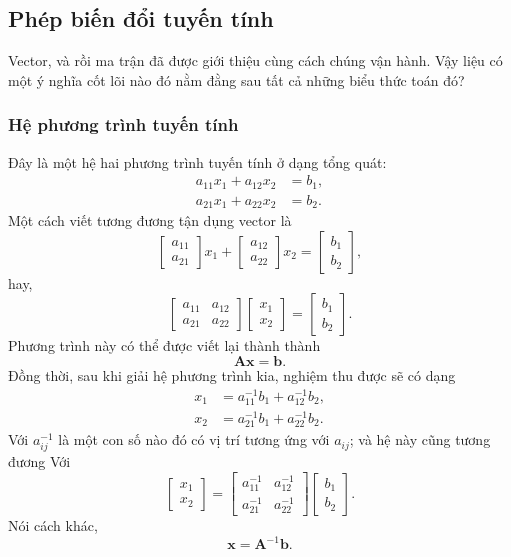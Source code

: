 \subsection{Phép biến đổi tuyến tính}
Vector, và rồi ma trận đã được giới thiệu cùng cách chúng vận hành. Vậy liệu có một ý nghĩa cốt lõi nào đó nằm đằng sau tất cả những biểu thức toán đó?  
\subsubsection*{Hệ phương trình tuyến tính}
Đây là một hệ hai phương trình tuyến tính ở dạng tổng quát:
\begin{align*}
a_{11}x_{1} + a_{12}x_{2} &= b_{1}, \\
a_{21}x_{1} + a_{22}x_{2} &= b_{2}.
\end{align*}
Một cách viết tương đương tận dụng vector là
\[\begin{bmatrix}
    a_{11}\\a_{21}
\end{bmatrix}x_{1}+\begin{bmatrix}
    a_{12}\\a_{22}
\end{bmatrix}x_{2}=\begin{bmatrix}
    b_{1}\\b_{2}
\end{bmatrix},\] hay,
\[\begin{bmatrix}
    a_{11}&a_{12}\\
    a_{21}&a_{22}
\end{bmatrix}\begin{bmatrix}
    x_{1}\\x_{2}
\end{bmatrix}=\begin{bmatrix}
    b_{1}\\b_{2}
\end{bmatrix}.\] Phương trình này có thể được viết lại thành thành \[\mathbf{A}\mathbf{x}=\mathbf{b}.\]
Đồng thời, sau khi giải hệ phương trình kia, nghiệm thu được sẽ có dạng
\begin{align*}
x_{1} &= a_{11}^{-1}b_{1} + a_{12}^{-1}b_{2}, \\
x_{2} &= a_{21}^{-1}b_{1} + a_{22}^{-1}b_{2}.
\end{align*}
Với \(a_{ij}^{-1}\) là một con số nào đó có vị trí tương ứng với \(a_{ij}\); và hệ này cũng tương đương Với
\[\begin{bmatrix}
    x_{1}\\x_{2}
\end{bmatrix}=\begin{bmatrix}
    a_{11}^{-1}&a_{12}^{-1}\\
    a_{21}^{-1}&a_{22}^{-1}
\end{bmatrix}\begin{bmatrix}
    b_{1}\\b_{2}
\end{bmatrix}.\] Nói cách khác, \[\mathbf{x}=\mathbf{A}^{-1}\mathbf{b}.\]
